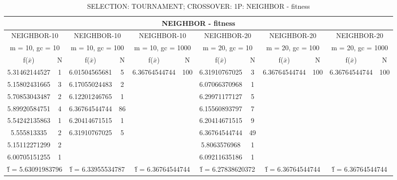 \begin{table}[H]
	\centering
	\caption{SELECTION: TOURNAMENT; CROSSOVER: 1P: NEIGHBOR - fitness}
	\begin{adjustbox}{width=1\textwidth}
		\begin{tabular}{ |c|c||c|c||c|c||c|c||c|c||c|c| }
			\hline
			\multicolumn{12}{|c|}{NEIGHBOR - fitness} \\
			\hline
			\multicolumn{2}{|c||}{NEIGHBOR-10} & \multicolumn{2}{c||}{NEIGHBOR-10} & \multicolumn{2}{c||}{NEIGHBOR-10} & \multicolumn{2}{c||}{NEIGHBOR-20} & \multicolumn{2}{c||}{NEIGHBOR-20} & \multicolumn{2}{c|}{NEIGHBOR-20}\\
			\hline
			\multicolumn{2}{|c||}{m = 10, gc = 10} & \multicolumn{2}{c||}{m = 10, gc = 100} & \multicolumn{2}{c||}{m = 10, gc = 1000} & \multicolumn{2}{c||}{m = 20, gc = 10} & \multicolumn{2}{c||}{m = 20, gc = 100} & \multicolumn{2}{c|}{m = 20, gc = 1000}\\
			\hline
			f($\bar{x}$) & N & f($\bar{x}$) & N & f($\bar{x}$) & N & f($\bar{x}$) & N & f($\bar{x}$) & N & f($\bar{x}$) & N\\
			\hline
			\hline
			5.31462144527 & 1 & 6.01504565681 & 5 & 6.36764544744 & 100 & 6.31910767025 & 3 & 6.36764544744 & 100 & 6.36764544744 & 100\\
			5.15802431665 & 3 & 6.17055024483 & 2 &   &   & 6.07066370968 & 1 &   &   &   &  \\
			5.70853043487 & 2 & 6.12201246765 & 1 &   &   & 6.29971177127 & 5 &   &   &   &  \\
			5.89920584751 & 4 & 6.36764544744 & 86 &   &   & 6.15560893797 & 7 &   &   &   &  \\
			5.54242135863 & 1 & 6.20414671515 & 1 &   &   & 6.20414671515 & 9 &   &   &   &  \\
			5.555813335 & 2 & 6.31910767025 & 5 &   &   & 6.36764544744 & 49 &   &   &   &  \\
			5.15112271299 & 2 &   &   &   &   & 5.8063576968 & 1 &   &   &   &  \\
			6.00705151255 & 1 &   &   &   &   & 6.09211635186 & 1 &   &   &   &  \\
			\hline
			\multicolumn{2}{|c||}{\^{f} = 5.63091983796} & \multicolumn{2}{c||}{\^{f} = 6.33955534787} & \multicolumn{2}{c||}{\^{f} = 6.36764544744} & \multicolumn{2}{c||}{\^{f} = 6.27838620372} & \multicolumn{2}{c||}{\^{f} = 6.36764544744} & \multicolumn{2}{c|}{\^{f} = 6.36764544744}\\
			\hline
		\end{tabular}
	\end{adjustbox}
\end{table}
